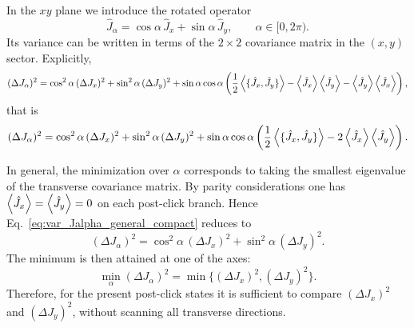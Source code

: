 In the $xy$ plane we introduce the rotated operator
\begin{equation}
	\hat J_{\alpha}
	=
	\cos\alpha\,\hat J_x+\sin\alpha\,\hat J_y,
	\qquad
	\alpha\in[0,2\pi).
	\label{eq:Jalpha_def}
\end{equation}
Its variance can be written in terms of the $2\times2$ covariance matrix in the $(x,y)$ sector.
Explicitly,
\begin{equation}
	(\Delta J_{\alpha})^{2}
	=
	\cos^{2}\alpha\,(\Delta J_x)^{2}
	+
	\sin^{2}\alpha\,(\Delta J_y)^{2}
	+
	\sin\alpha\cos\alpha
	\left(
	\frac{1}{2}\expval{\{\hat J_x,\hat J_y\}}
	-
	\expval{\hat J_x}\expval{\hat J_y}
	-
	\expval{\hat J_y}\expval{\hat J_x}
	\right),
	\label{eq:var_Jalpha_general}
\end{equation}
that is
\begin{equation}
	(\Delta J_{\alpha})^{2}
	=
	\cos^{2}\alpha\,(\Delta J_x)^{2}
	+
	\sin^{2}\alpha\,(\Delta J_y)^{2}
	+
	\sin\alpha\cos\alpha
	\left(
	\frac{1}{2}\expval{\{\hat J_x,\hat J_y\}}
	-
	2\expval{\hat J_x}\expval{\hat J_y}
	\right).
	\label{eq:var_Jalpha_general_compact}
\end{equation}

In general, the minimization over $\alpha$ corresponds to taking the smallest eigenvalue of the
transverse covariance matrix. By parity considerations one has $\expval{\hat J_x}=\expval{\hat J_y}=0$ on each post-click branch.
Hence Eq.~\eqref{eq:var_Jalpha_general_compact} reduces to
\begin{equation}
	(\Delta J_{\alpha})^{2}
	=
	\cos^{2}\alpha\,(\Delta J_x)^{2}
	+
	\sin^{2}\alpha\,(\Delta J_y)^{2}.
	\label{eq:var_Jalpha_diagonal}
\end{equation}
The minimum is then attained at one of the axes:
\begin{equation}
	\min_{\alpha}(\Delta J_{\alpha})^{2}
	=
	\min\!\big\{(\Delta J_x)^{2},(\Delta J_y)^{2}\big\}.
	\label{eq:min_var_xy_axes}
\end{equation}
Therefore, for the present post-click states it is sufficient to compare $(\Delta J_x)^2$ and $(\Delta J_y)^2$,
without scanning all transverse directions.

